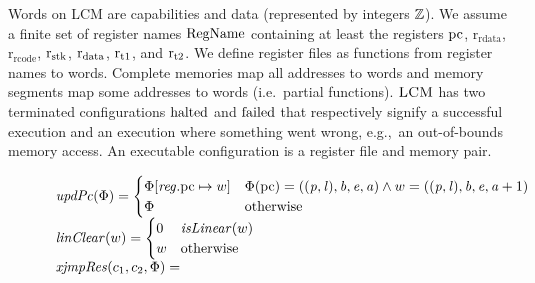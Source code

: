 \documentclass[acmsmall,screen]{acmart}\settopmatter{}
\renewcommand{\RegName}{\shareddom{RegName}}
\renewcommand{\decInstr}[1]{\plainfun{decode}{#1}}
\renewcommand{\updPcAddr}[1]{\plainfun{updPc}{#1}}
\renewcommand{\linCons}[1]{\plainfun{linClear}{#1}}
\renewcommand{\perm}{\var{p}}
\renewcommand{\rretc}{\mathrm{r}_{\mathrm{rcode}}}
\renewcommand{\rretd}{\mathrm{r}_{\mathrm{rdata}}}
\newcommand{\xjmpres}[1]{\plainfun{xjmpRes}{#1}}
\newcommand{\trgcm}{\textsc{LCM}}
\begin{document}
Words on \trgcm{} are capabilities and data (represented by integers $\mathbb{Z}$).
We assume a finite set of register names $\RegName$ containing at least the registers $\mathrm{pc}$, $\rretd$, $\rretc$, $\mathrm{r}_\mathrm{stk}$, $\mathrm{r}_\mathrm{data}$, $\mathrm{r}_\mathrm{t1}$, and $\mathrm{r}_\mathrm{t2}$.
We define register files as functions from register names to words.
Complete memories map all addresses to words and memory segments map some addresses to words (i.e.\ partial functions).
$\trgcm{}$ has two terminated configurations $\mathrm{halted}$ and $\mathrm{failed}$ that respectively signify a successful execution and an execution where something went wrong, e.g.,\ an out-of-bounds memory access.
An executable configuration is a register file and memory pair.

\begin{figure}[p]
  \centering
  \[
    \begin{array}{l}
  \updPcAddr{\Phi} =
  \begin{cases}
    \Phi\updReg{\pcreg}{w} & \Phi(\pcreg) = ((\perm,\lin),\baddr,\eaddr,\aaddr) \wedge w = ((\perm,\lin),\baddr,\eaddr,\aaddr+1)\\
    \Phi  & \totherwise
  \end{cases}\\
  \linCons{w} =
  \begin{cases}
    0 & \isLinear{w} \\
    w & \totherwise
  \end{cases}\\
  \xjmpres{c_1,c_2,\Phi} =

\end{array}\]
\end{figure}
\end{document}
